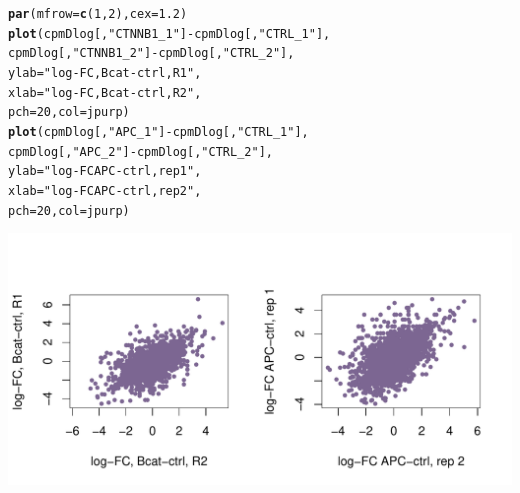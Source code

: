 \documentclass[a4paper]{article}\usepackage[]{graphicx}\usepackage[]{color}
\makeatletter
\def\maxwidth{ %
  \ifdim\Gin@nat@width>\linewidth
    \linewidth
  \else
    \Gin@nat@width
  \fi
}
\newcommand{\hlnum}[1]{\textcolor[rgb]{0.686,0.059,0.569}{#1}}%
\newcommand{\hlstr}[1]{\textcolor[rgb]{0.192,0.494,0.8}{#1}}%
\newcommand{\hlopt}[1]{\textcolor[rgb]{0,0,0}{#1}}%
\newcommand{\hlstd}[1]{\textcolor[rgb]{0.345,0.345,0.345}{#1}}%
\newcommand{\hlkwc}[1]{\textcolor[rgb]{0.333,0.667,0.333}{#1}}%
\newcommand{\hlkwd}[1]{\textcolor[rgb]{0.737,0.353,0.396}{\textbf{#1}}}%
\newenvironment{kframe}{%
 \def\at@end@of@kframe{}%
 \ifinner\ifhmode%
  \def\at@end@of@kframe{\end{minipage}}%
  \begin{minipage}{\columnwidth}%
 \fi\fi%
 \def\FrameCommand##1{\hskip\@totalleftmargin \hskip-\fboxsep
 \colorbox{shadecolor}{##1}\hskip-\fboxsep
     \hskip-\linewidth \hskip-\@totalleftmargin \hskip\columnwidth}%
 \MakeFramed {\advance\hsize-\width
   \@totalleftmargin\z@ \linewidth\hsize
   \@setminipage}}%
 {\par\unskip\endMakeFramed%
 \at@end@of@kframe}
\newenvironment{knitrout}{}{} %
\makeatother
\begin{document}
\begin{knitrout}
\color{fgcolor}\begin{kframe}
\begin{alltt}
\hlkwd{par}\hlstd{(}\hlkwc{mfrow}\hlstd{=}\hlkwd{c}\hlstd{(}\hlnum{1}\hlstd{,}\hlnum{2}\hlstd{),} \hlkwc{cex}\hlstd{=}\hlnum{1.2}\hlstd{)}
\hlkwd{plot}\hlstd{(cpmDlog[,}\hlstr{"CTNNB1_1"}\hlstd{]}\hlopt{-}\hlstd{cpmDlog[,}\hlstr{"CTRL_1"}\hlstd{],}
     \hlstd{cpmDlog[,}\hlstr{"CTNNB1_2"}\hlstd{]}\hlopt{-}\hlstd{cpmDlog[,}\hlstr{"CTRL_2"}\hlstd{],}
     \hlkwc{ylab}\hlstd{=}\hlstr{"log-FC, Bcat-ctrl, R1"}\hlstd{,}
     \hlkwc{xlab}\hlstd{=}\hlstr{"log-FC, Bcat-ctrl, R2"}\hlstd{,}
     \hlkwc{pch}\hlstd{=}\hlnum{20}\hlstd{,} \hlkwc{col}\hlstd{=jpurp)}
\hlkwd{plot}\hlstd{(cpmDlog[,}\hlstr{"APC_1"}\hlstd{]}\hlopt{-}\hlstd{cpmDlog[,}\hlstr{"CTRL_1"}\hlstd{],}
     \hlstd{cpmDlog[,}\hlstr{"APC_2"}\hlstd{]}\hlopt{-}\hlstd{cpmDlog[,}\hlstr{"CTRL_2"}\hlstd{],}
     \hlkwc{ylab}\hlstd{=}\hlstr{"log-FC APC-ctrl, rep 1"}\hlstd{,}
     \hlkwc{xlab}\hlstd{=}\hlstr{"log-FC APC-ctrl, rep 2"}\hlstd{,}
     \hlkwc{pch}\hlstd{=}\hlnum{20}\hlstd{,} \hlkwc{col}\hlstd{=jpurp)}
\end{alltt}
\end{kframe}
\includegraphics[width=\maxwidth]{figure/voomRepPlot} 

\end{knitrout}
\end{document}
